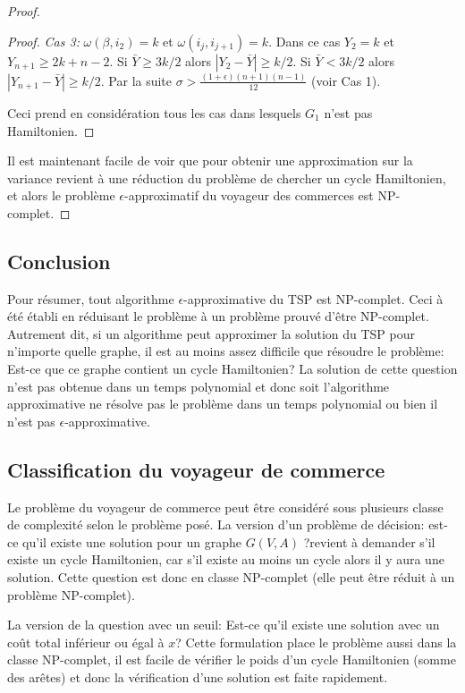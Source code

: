 \documentclass[../main.tex]{subfiles}
\begin{document}
\begin{proof}
\begin{proof}
\emph{Cas 3:} $\omega (\beta, i_2) = k$ et $\omega (i_j, i_{j+1})=k$. Dans ce cas $Y_2=k$ et $Y_{n+1} \geq 2k+n-2$. Si $\bar{Y} \geq 3k/2$ alors $|Y_2 - \bar{Y}| \geq k/2$. Si $\bar{Y} < 3k/2$ alors $|Y_{n+1} - \bar{Y}| \geq k/2$. Par la suite $\sigma > \frac{(1+\epsilon)(n+1)(n-1)}{12}$ (voir Cas 1).

Ceci prend en considération tous les cas dans lesquels $G_1$ n'est pas Hamiltonien.
\end{proof}

Il est maintenant facile de voir que pour obtenir une approximation sur la variance revient à une réduction du problème de chercher un cycle Hamiltonien, et alors le problème $\epsilon$-approximatif du voyageur des commerces est NP-complet.

\end{proof}

\subsection{Conclusion}
Pour résumer, tout algorithme $\epsilon$-approximative du TSP est NP-complet. Ceci à été établi en réduisant le problème à un problème prouvé d'être NP-complet. Autrement dit, si un algorithme peut approximer la solution du TSP pour n'importe quelle graphe, il est au moins assez difficile que résoudre le problème: Est-ce que ce graphe contient un cycle Hamiltonien? La solution de cette question n'est pas obtenue dans un temps polynomial et donc soit l'algorithme approximative ne résolve pas le problème dans un temps polynomial ou bien il n'est pas $\epsilon$-approximative.

\subsection{Classification du voyageur de commerce}
Le problème du voyageur de commerce peut être considéré sous plusieurs classe de complexité selon le problème posé. La version d'un problème de décision: est-ce qu'il existe une solution pour un graphe $G(V,A)$ ?revient à demander s'il existe un cycle Hamiltonien, car s'il existe au moins un cycle alors il y aura une solution. Cette question est donc en classe NP-complet (elle peut être réduit à un problème NP-complet).

La version de la question avec un seuil: Est-ce qu'il existe une solution avec un coût total inférieur ou égal à $x$? Cette formulation place le problème aussi dans la classe NP-complet, il est facile de vérifier le poids d'un cycle Hamiltonien (somme des arêtes) et donc la vérification d'une solution est faite rapidement.
\end{document}
